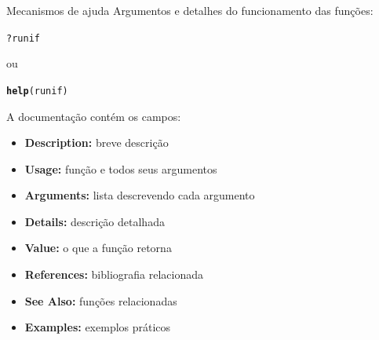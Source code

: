 \documentclass[10pt,handout]{beamer}\usepackage[]{graphicx}\usepackage[]{color}
\makeatletter
\newcommand{\hlopt}[1]{\textcolor[rgb]{0,0,0}{#1}}%
\newcommand{\hlstd}[1]{\textcolor[rgb]{0.345,0.345,0.345}{#1}}%
\newcommand{\hlkwd}[1]{\textcolor[rgb]{0.737,0.353,0.396}{\textbf{#1}}}%
\newenvironment{kframe}{%
 \def\at@end@of@kframe{}%
 \ifinner\ifhmode%
  \def\at@end@of@kframe{\end{minipage}}%
  \begin{minipage}{\columnwidth}%
 \fi\fi%
 \def\FrameCommand##1{\hskip\@totalleftmargin \hskip-\fboxsep
 \colorbox{shadecolor}{##1}\hskip-\fboxsep
     \hskip-\linewidth \hskip-\@totalleftmargin \hskip\columnwidth}%
 \MakeFramed {\advance\hsize-\width
   \@totalleftmargin\z@ \linewidth\hsize
   \@setminipage}}%
 {\par\unskip\endMakeFramed%
 \at@end@of@kframe}
\newenvironment{knitrout}{}{} %
\makeatother
\begin{document}
\begin{frame}[fragile]{Mecanismos de ajuda}
Argumentos e detalhes do funcionamento das funções:
\begin{knitrout}\small
{}\color{fgcolor}\begin{kframe}
\begin{alltt}
\hlopt{?}\hlstd{runif}
\end{alltt}
\end{kframe}
\end{knitrout}
ou
\begin{knitrout}\small
{}\color{fgcolor}\begin{kframe}
\begin{alltt}
\hlkwd{help}\hlstd{(runif)}
\end{alltt}
\end{kframe}
\end{knitrout}
A documentação contém os campos:
\begin{itemize}
\item \textbf{Description:} breve descrição
\item \textbf{Usage:} função e todos seus argumentos
\item \textbf{Arguments:} lista descrevendo cada argumento
\item \textbf{Details:} descrição detalhada
\item \textbf{Value:} o que a função retorna
\item \textbf{References:} bibliografia relacionada
\item \textbf{See Also:} funções relacionadas
\item \textbf{Examples:} exemplos práticos
\end{itemize}
\end{frame}
\end{document}
